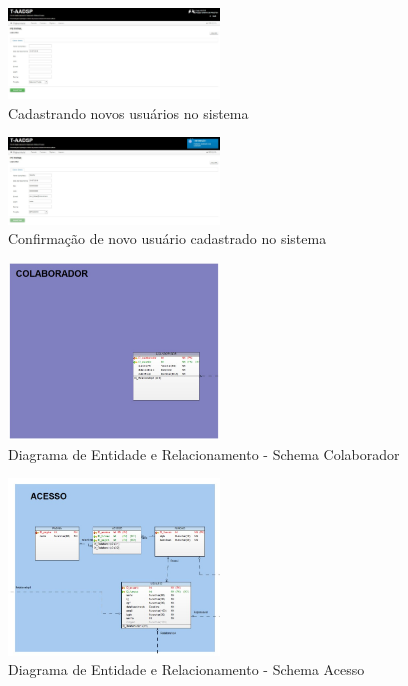 \documentclass{acm_proc_article-sp}
\begin{document}
\begin{figure}[h]
\centering %
\includegraphics[width=0.5\textwidth]{RF_cadastro_de_usuario.jpg} %
\caption{Cadastrando novos usuários no sistema}
\end{figure}

\begin{figure}[h]
\centering %
\includegraphics[width=0.5\textwidth]{RF_cadastro_de_usuario_realizado.jpg} %
\caption{Confirmação de novo usuário cadastrado no sistema}
\end{figure}

\begin{figure}[h]
\centering %
\includegraphics[width=0.5\textwidth]{DER_colaborador.jpg} %
\caption{Diagrama de Entidade e Relacionamento - Schema Colaborador}
\end{figure}

\begin{figure}[h]
\centering %
\includegraphics[width=0.5\textwidth]{DER_acesso.jpg} %
\caption{Diagrama de Entidade e Relacionamento - Schema Acesso}
\end{figure} 
\end{document}
